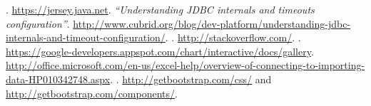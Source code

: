 \documentclass[a4paper,12pt,english]{book}
\begin{document}
%
%





\begin{thebibliography}{1}

	. \url{https://jersey.java.net}.
	\bibitem{}{} 
		{\em ``Understanding JDBC internals and timeouts configuration''}.
		\url{http://www.cubrid.org/blog/dev-platform/understanding-jdbc-internals-and-timeout-configuration/}.
	. \url{http://stackoverflow.com/}.
	.
	\url{https://google-developers.appspot.com/chart/interactive/docs/gallery}.
	\url{http://office.microsoft.com/en-us/excel-help/overview-of-connecting-to-importing-data-HP010342748.aspx}.
	. \url{http://getbootstrap.com/css/}
	and \url{http://getbootstrap.com/components/}.
\end{thebibliography}
\end{document}
